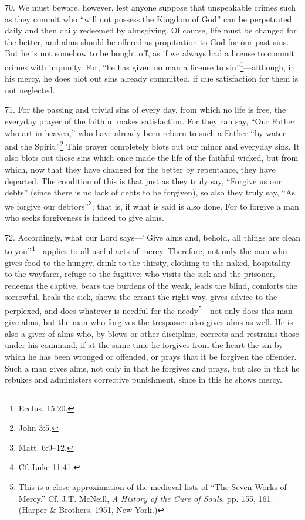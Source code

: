 70. We must beware, however, lest anyone suppose that unspeakable crimes such as they commit who ``will not possess the Kingdom of God'' can be perpetrated daily and then daily redeemed by almsgiving. Of course, life must be changed for the better, and alms should be offered as propitiation to God for our past sins. But he is not somehow to be bought off, as if we always had a license to commit crimes with impunity. For, ``he has given no man a license to sin''\footnote{Ecclus. 15:20.}—although, in his mercy, he does blot out sins already committed, if due satisfaction for them is not neglected.

71. For the passing and trivial sins of every day, from which no life is free, the everyday prayer of the faithful makes satisfaction. For they can say, ``Our Father who art in heaven,'' who have already been reborn to such a Father ``by water and the Spirit.''\footnote{John 3:5.} This prayer completely blots out our minor and everyday sins. It also blots out those sins which once made the life of the faithful wicked, but from which, now that they have changed for the better by repentance, they have departed. The condition of this is that just as they truly say, ``Forgive us our debts'' (since there is no lack of debts to be forgiven), so also they truly say, ``As we forgive our debtors''\footnote{Matt. 6:9–12.}; that is, if what is said is also done. For to forgive a man who seeks forgiveness is indeed to give alms.

72. Accordingly, what our Lord says—``Give alms and, behold, all things are clean to you''\footnote{Cf. Luke 11:41.}—applies to all useful acts of mercy. Therefore, not only the man who gives food to the hungry, drink to the thirsty, clothing to the naked, hospitality to the wayfarer, refuge to the fugitive; who visits the sick and the prisoner, redeems the captive, bears the burdens of the weak, leads the blind, comforts the sorrowful, heals the sick, shows the errant the right way, gives advice to the perplexed, and does whatever is needful for the needy\footnote{This is a close approximation of the medieval lists of ``The Seven Works of Mercy.'' Cf. J.T. McNeill, \emph{A History of the Cure of Souls}, pp. 155, 161. (Harper \& Brothers, 1951, New York.)}—not only does this man give alms, but the man who forgives the trespasser also gives alms as well. He is also a giver of alms who, by blows or other discipline, corrects and restrains those under his command, if at the same time he forgives from the heart the sin by which he has been wronged or offended, or prays that it be forgiven the offender. Such a man gives alms, not only in that he forgives and prays, but also in that he rebukes and administers corrective punishment, since in this he shows mercy.

